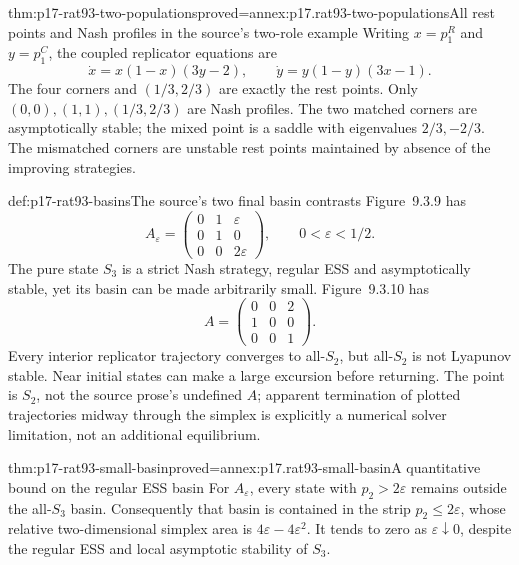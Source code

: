 \begin{hbtheorem}{thm:p17-rat93-two-populations}{proved=annex:p17.rat93-two-populations}{All rest points and Nash profiles in the source's two-role example}
Writing \(x=p_1^R\) and \(y=p_1^C\), the coupled replicator equations are
\[
 \dot x=x(1-x)(3y-2),\qquad
 \dot y=y(1-y)(3x-1).
\]
The four corners and \((1/3,2/3)\) are exactly the rest points.
Only \((0,0),(1,1),(1/3,2/3)\) are Nash profiles.
The two matched corners are asymptotically stable; the mixed point is
a saddle with eigenvalues \(2/3,-2/3\). The mismatched corners are
unstable rest points maintained by absence of the improving strategies.
\end{hbtheorem}

\begin{hbexample}{def:p17-rat93-basins}{The source's two final basin contrasts}
Figure~9.3.9 has
\[
 A_\varepsilon=
 \begin{pmatrix}0&1&\varepsilon\\0&1&0\\0&0&2\varepsilon\end{pmatrix},
 \qquad 0<\varepsilon<1/2.
\]
The pure state \(S_3\) is a strict Nash strategy, regular ESS and
asymptotically stable, yet its basin can be made arbitrarily small.
Figure~9.3.10 has
\[
 A=\begin{pmatrix}0&0&2\\1&0&0\\0&0&1\end{pmatrix}.
\]
Every interior replicator trajectory converges to all-\(S_2\), but
all-\(S_2\) is not Lyapunov stable. Near initial states can make a
large excursion before returning. The point is \(S_2\), not the
source prose's undefined \(A\); apparent termination of plotted
trajectories midway through the simplex is explicitly a numerical
solver limitation, not an additional equilibrium.
\end{hbexample}

\begin{hbtheorem}{thm:p17-rat93-small-basin}{proved=annex:p17.rat93-small-basin}{A quantitative bound on the regular ESS basin}
For \(A_\varepsilon\), every state with \(p_2>2\varepsilon\)
remains outside the all-\(S_3\) basin. Consequently that basin is
contained in the strip \(p_2\leq2\varepsilon\), whose relative
two-dimensional simplex area is \(4\varepsilon-4\varepsilon^2\).
It tends to zero as \(\varepsilon\downarrow0\), despite the
regular ESS and local asymptotic stability of \(S_3\).
\end{hbtheorem}

